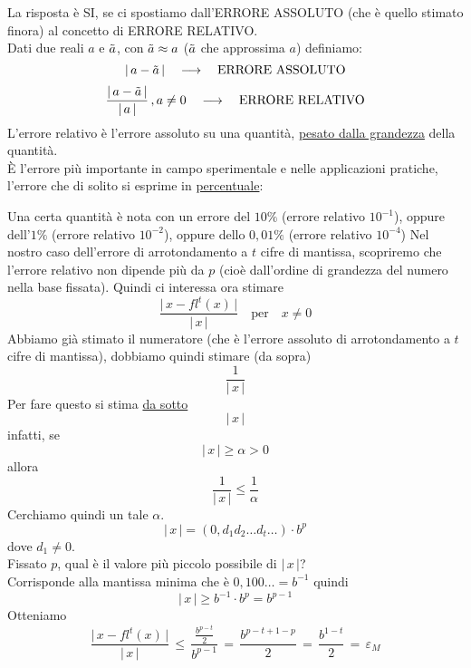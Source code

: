 La risposta è SI, se ci spostiamo dall'ERRORE ASSOLUTO (che è quello stimato finora) al concetto di ERRORE RELATIVO. \\
Dati due reali $a$ e $\Tilde{a}$, con $\Tilde{a} \approx a$ ($\Tilde{a}$ che approssima $a$) definiamo:
\[ \lvert \, a - \Tilde{a} \, \rvert \quad \longrightarrow \quad \text{ERRORE ASSOLUTO}\]
\[ \frac{\lvert \, a - \Tilde{a} \, \rvert}{\lvert \, a \, \rvert} \, , a \ne 0 \quad \longrightarrow \quad \text{ERRORE RELATIVO} \]
L'errore relativo è l'errore assoluto su una quantità, \uline{pesato dalla grandezza} della quantità. \\
È l'errore più importante in campo sperimentale e nelle applicazioni pratiche, l'errore che di solito si esprime in \uline{percentuale}:
\begin{esempio} \end{esempio}
Una certa quantità è nota con un errore del $10\%$ (errore relativo $10^{-1}$), oppure dell'$1\%$ (errore relativo $10^{-2}$), oppure dello $0,01\%$ (errore relativo $10^{-4}$)
\newline \newline
Nel nostro caso dell'errore di arrotondamento a $t$ cifre di mantissa, scopriremo che l'errore relativo non dipende più da $p$ (cioè dall'ordine di grandezza del numero nella base fissata). Quindi ci interessa ora stimare
\[ \frac{\lvert \, x - fl^t(x) \, \rvert}{\lvert \, x \, \rvert} \quad \text{per}\quad x \ne 0 \]
Abbiamo già stimato il numeratore (che è l'errore assoluto di arrotondamento a $t$ cifre di mantissa), dobbiamo quindi stimare (da sopra) \[ \frac{1}{\lvert \, x  \, \rvert} \]
Per fare questo si stima \uline{da sotto} \[ \lvert \, x \, \rvert \]
infatti, se \[ \lvert \, x \, \rvert \ge \alpha > 0 \] allora 
\[ \frac{1}{\lvert \, x \, \rvert} \le \frac{1}{\alpha} \]
Cerchiamo quindi un tale $\alpha$.
\[ \lvert \, x \, \rvert = (0,d_1 d_2 \dotsc d_t \dotsc ) \cdot b^p \] dove $d_1 \ne 0$. \\
Fissato $p$, qual è il valore più piccolo possibile di $\lvert \, x \, \rvert$? \\
Corrisponde alla mantissa minima che è $0,100 \dotsc = b^{-1}$ quindi
\[ \lvert \, x \, \rvert \ge b^{-1} \cdot b^p = b^{p-1} \] Otteniamo
\[ \frac{\lvert \, x - fl^t(x) \, \rvert}{\lvert \, x \, \rvert} \, \le \, \frac{\frac{b^{p-t}}{2}}{b^{p-1}} \,=\, \frac{b^{p-t+1-p}}{2} \,=\, \frac{b^{1-t}}{2} \,=\, \varepsilon_M\]

